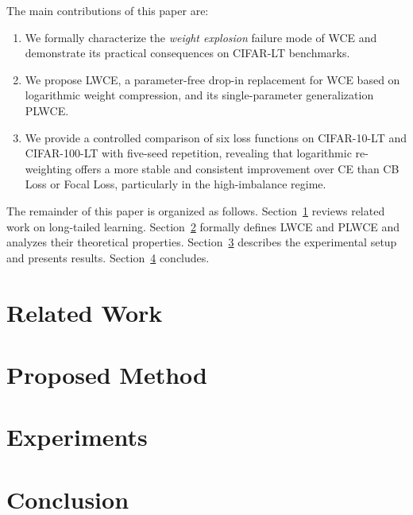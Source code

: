 \documentclass[12pt]{article}
\begin{document}
The main contributions of this paper are:
\begin{enumerate}
  \item We formally characterize the \textit{weight explosion} failure mode of WCE
        and demonstrate its practical consequences on CIFAR-LT benchmarks.
  \item We propose LWCE, a parameter-free drop-in replacement for WCE based on
        logarithmic weight compression, and its single-parameter generalization PLWCE.
  \item We provide a controlled comparison of six loss functions on CIFAR-10-LT and
        CIFAR-100-LT with five-seed repetition, revealing that logarithmic re-weighting
        offers a more stable and consistent improvement over CE than CB Loss or Focal
        Loss, particularly in the high-imbalance regime.
\end{enumerate}

The remainder of this paper is organized as follows.
Section~\ref{sec:related} reviews related work on long-tailed learning.
Section~\ref{sec:method} formally defines LWCE and PLWCE and analyzes their
theoretical properties.
Section~\ref{sec:experiments} describes the experimental setup and presents results.
Section~\ref{sec:conclusion} concludes.

\section{Related Work}
\label{sec:related}

\section{Proposed Method}
\label{sec:method}

\section{Experiments}
\label{sec:experiments}

\section{Conclusion}
\label{sec:conclusion}

\nocite{*}


\end{document}
